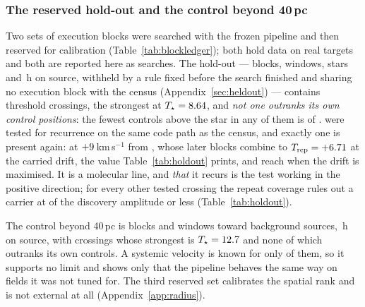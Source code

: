 \subsubsection{The reserved hold-out and the control beyond 40\,pc}
\label{sec:holdoutsearch}

Two sets of execution blocks were searched with the frozen pipeline and then
reserved for calibration (Table~\ref{tab:blockledger}); both hold data on real
targets and both are reported here as searches. The hold-out --- \HoNBlock{}
blocks, \HoNWin{} windows, \HoNStar{} stars and \HoHours\,h on source,
withheld by a rule fixed before the search finished and sharing no execution
block with the census (Appendix~\ref{sec:heldout}) --- contains \HoNCross{}
threshold crossings, the strongest at $T_\star=8.64$, and \emph{not one
outranks its own control positions}: the fewest controls above the star in any
of them is \HoNCtrlMin{} of \NCtrl. \HoNTested{} were tested for recurrence on the same
code path as the census, and exactly one is present again: \HoRecStar{} at
$+9$\,km\,s$^{-1}$ from \HoRecLine, whose \HoRecNRep{} later blocks
combine to $T_{\rm rep}=+6.71$ at the carried drift, the value
Table~\ref{tab:holdout} prints, and reach \HoRecTAnyDrift{} when the drift is
maximised. It is a molecular line, and \emph{that} it recurs is the test
working in the positive direction; for every other tested crossing the repeat
coverage rules out a carrier at \HoFracMax{} of the discovery amplitude or
less (Table~\ref{tab:holdout}).

The control beyond 40\,pc is \OosNBlock{} blocks and \OosNWin{} windows toward
\OosNStar{} background sources, \OosHours\,h on source, with \OosNCross{}
crossings whose strongest is $T_\star=12.7$ and none of which outranks its
own controls. A systemic velocity is known for only \OosNVsys{} of them, so it
supports no limit and shows only that the pipeline behaves the same way on
fields it was not tuned for. The third reserved set calibrates the spatial rank
and is not external at all (Appendix~\ref{app:radius}).

